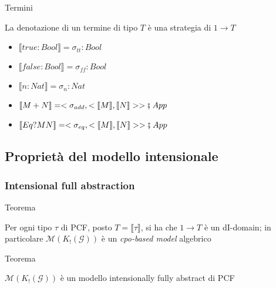 \documentclass{beamer}
\begin{document}
\begin{frame}
	
	\begin{block}{Termini}
		
		La denotazione di un termine di tipo $T$ è una strategia di $1\rightarrow T$
		
		\begin{itemize}
			\item $\llbracket true : Bool \rrbracket = \sigma_{tt} : Bool$
			\item $\llbracket false : Bool \rrbracket = \sigma_{ff} : Bool$
			\item $\llbracket n : Nat \rrbracket = \sigma_n : Nat$
			\item $\llbracket M + N \rrbracket = < \sigma_{add} , < \llbracket M \rrbracket , \llbracket N \rrbracket > > \fatsemi \; App$
			\item $\llbracket Eq? M N \rrbracket = < \sigma_{eq} , < \llbracket M \rrbracket , \llbracket N \rrbracket > > \fatsemi \; App$
		\end{itemize}

	\end{block}

	
\end{frame}





\subsection{Proprietà del modello intensionale}

\begin{frame}
	
	\frametitle{Intensional full abstraction}
	
	
	\begin{block}{Teorema}
		
		Per ogni tipo $\tau$ di PCF, posto $T= \llbracket \tau \rrbracket$, si ha che $1 \rightarrow T$ è un dI-domain;
		in particolare $\mathcal{M}(K_! (\mathcal{G}) )$ è un \emph{cpo-based model} algebrico
		
	\end{block}
	
	
	\begin{block}{Teorema}
		
		$\mathcal{M}(K_! (\mathcal{G}) )$ è un modello intensionally fully abstract di PCF
		
	\end{block}
	
	
\end{frame}
\end{document}
